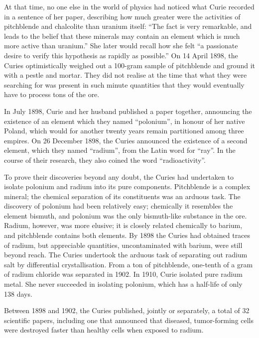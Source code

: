 \documentclass[12pt,a4paper]{article}
\begin{document}
At that time, no one else in the world of physics had noticed what Curie recorded in a sentence of her paper, describing how much greater were the activities of pitchblende and chalcolite than uranium itself: ``The fact is very remarkable, and leads to the belief that these minerals may contain an element which is much more active than uranium.'' She later would recall how she felt ``a passionate desire to verify this hypothesis as rapidly as possible.''\cite{Reid:1974:MSC65} On 14 April 1898, the Curies optimistically weighed out a 100-gram sample of pitchblende and ground it with a pestle and mortar. They did not realise at the time that what they were searching for was present in such minute quantities that they would eventually have to process tons of the ore.\cite{Reid:1974:MSC65}

In July 1898, Curie and her husband published a paper together, announcing the existence of an element which they named ``polonium'', in honour of her native Poland, which would for another twenty years remain partitioned among three empires.\cite{Estreicher:1938:CMZS} On 26 December 1898, the Curies announced the existence of a second element, which they named ``radium'', from the Latin word for ``ray''. In the course of their research, they also coined the word ``radioactivity''.\cite{Estreicher:1938:CMZS}

To prove their discoveries beyond any doubt, the Curies had undertaken to isolate polonium and radium into its pure components. Pitchblende is a complex mineral; the chemical separation of its constituents was an arduous task. The discovery of polonium had been relatively easy; chemically it resembles the element bismuth, and polonium was the only bismuth-like substance in the ore. Radium, however, was more elusive; it is closely related chemically to barium, and pitchblende contains both elements. By 1898 the Curies had obtained traces of radium, but appreciable quantities, uncontaminated with barium, were still beyond reach. The Curies undertook the arduous task of separating out radium salt by differential crystallisation. From a ton of pitchblende, one-tenth of a gram of radium chloride was separated in 1902. In 1910, Curie isolated pure radium metal. She never succeeded in isolating polonium, which has a half-life of only 138 days.

Between 1898 and 1902, the Curies published, jointly or separately, a total of 32 scientific papers, including one that announced that diseased, tumor-forming cells were destroyed faster than healthy cells when exposed to radium.
\end{document}
